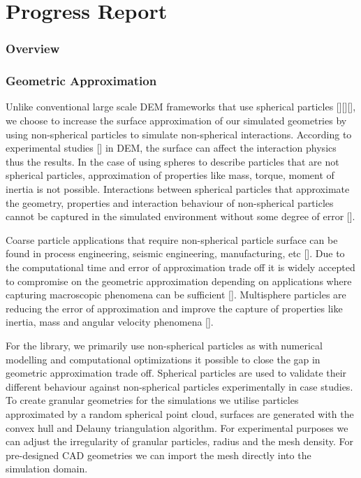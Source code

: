 \documentclass[times,12pt]{article}
\begin{document}
\section{Progress Report}

\subsubsection{Overview}



\subsubsection{Geometric Approximation}

Unlike conventional large scale DEM frameworks that use spherical particles [][][], we choose to increase the surface approximation of our simulated geometries by using non-spherical particles to simulate non-spherical interactions. According to experimental studies [] in DEM, the surface can affect the interaction physics thus the results. In the case of using spheres to describe particles that are not spherical particles, approximation of properties like mass, torque, moment of inertia is not possible. Interactions between spherical particles that approximate the geometry, properties and interaction behaviour of non-spherical particles cannot be captured in the simulated environment without some degree of error []. 

Coarse particle applications that require non-spherical particle surface can be found in process engineering, seismic engineering, manufacturing, etc []. Due to the computational time and error of approximation trade off it is widely accepted to compromise on the geometric approximation depending on applications where capturing macroscopic phenomena can be sufficient []. Multisphere particles are reducing the error of approximation and improve the capture of properties like inertia, mass and angular velocity phenomena [].   

For the library, we primarily use non-spherical particles as with numerical modelling and computational optimizations it possible to close the gap in geometric approximation trade off. Spherical particles are used to validate their different behaviour against non-spherical particles experimentally in case studies. To create granular geometries for the simulations we utilise particles approximated by a random spherical point cloud, surfaces are generated with the convex hull and Delauny triangulation algorithm. For experimental purposes we can adjust the irregularity of granular particles, radius and the mesh density. For pre-designed CAD geometries we can import the mesh directly into the simulation domain. 
\end{document}
